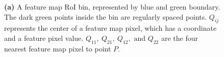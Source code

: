\begin{figure}[!ht]
    \centering
    \caption{\textbf{(a)} A feature map RoI bin, represented by blue and green boundary. The dark green points inside the bin are regularly spaced points. $Q_{ij}$ represents the center of a feature map pixel, which has a coordinate and a feature pixel value. $Q_{11},\ Q_{21},\ Q_{12},\text{ and } Q_{22}$ are the four nearest feature map pixel to point $P$.}
    \label{fig:bin_w_regularly_points}
\end{figure}

